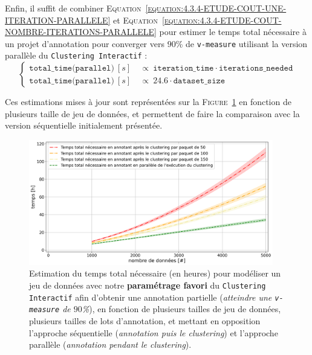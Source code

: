 			Enfin, il suffit de combiner \textsc{Equation~\ref{equation:4.3.4-ETUDE-COUT-UNE-ITERATION-PARALLELE}} et \textsc{Equation~\ref{equation:4.3.4-ETUDE-COUT-NOMBRE-ITERATIONS-PARALLELE}} pour estimer le temps total nécessaire à un projet d'annotation pour converger vers $90$\% de \texttt{v-measure} utilisant la version parallèle du \texttt{Clustering Interactif} :
			\begin{equation}
				\label{equation:4.3.4-ETUDE-COUT-TOTAL-PARALLELE}
				\begin{cases}
					\texttt{total\_time(parallel)}~[s] &
						~\propto~\texttt{iteration\_time} \cdot \texttt{iterations\_needed} \\
					\texttt{total\_time(parallel)}~[s] &
						~\propto~24.6 \cdot \texttt{dataset\_size}
				\end{cases}
			\end{equation}
			
			Ces estimations mises à jour sont représentées sur la \textsc{Figure~\ref{figure:4.3.4-ETUDE-COUT-TOTAL}} en fonction de plusieurs taille de jeu de données, et permettent de faire la comparaison avec la version séquentielle initialement présentée.
			
			\begin{figure}[!htb]
				\centering
				\includegraphics[width=0.95\textwidth]{figures/etude-temps-total-2-modelisation-parallele}
				\caption{
					Estimation du temps total nécessaire (en heures) pour modéliser un jeu de données avec notre \textbf{paramétrage favori} du \texttt{Clustering Interactif} afin d'obtenir une annotation partielle (\textit{atteindre une \texttt{v-measure} de $90$\%}), en fonction de plusieurs tailles de jeu de données, plusieurs tailles de lots d'annotation, et mettant en opposition l'approche séquentielle (\textit{annotation puis le \textit{clustering}}) et l'approche parallèle (\textit{annotation pendant le \textit{clustering}}).
				}
				\label{figure:4.3.4-ETUDE-COUT-TOTAL}
			\end{figure}
			
